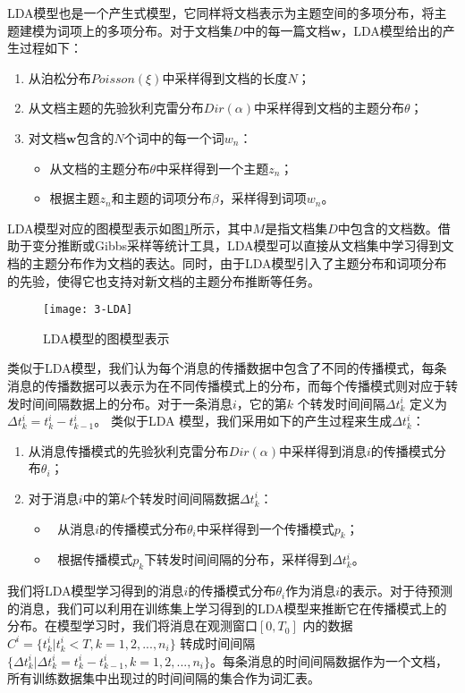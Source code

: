 LDA模型也是一个产生式模型，它同样将文档表示为主题空间的多项分布，将主题建模为词项上的多项分布。对于文档集$D$中的每一篇文档$\pmb{w}$，LDA模型给出的产生过程如下：
\begin{enumerate}
\item 从泊松分布$Poisson(\xi)$中采样得到文档的长度$N$；
\item 从文档主题的先验狄利克雷分布$Dir(\alpha)$中采样得到文档的主题分布$\theta$；
\item 对文档$\pmb{w}$包含的$N$个词中的每一个词$w_n$：
\begin{itemize}
\item 从文档的主题分布$\theta$中采样得到一个主题$z_n$；
\item 根据主题$z_n$和主题的词项分布$\beta$，采样得到词项$w_n$。
\end{itemize}
\end{enumerate}
LDA模型对应的图模型表示如图\ref{fig:LDA}所示，其中$M$是指文档集$D$中包含的文档数。借助于变分推断或Gibbs采样等统计工具，LDA模型可以直接从文档集中学习得到文档的主题分布作为文档的表达。同时，由于LDA模型引入了主题分布和词项分布的先验，使得它也支持对新文档的主题分布推断等任务。
\begin{figure}[!htbp]
  \centering
  \texttt{[image: 3-LDA]}
  \caption{LDA模型的图模型表示\citep{blei2003latent}}
  \label{fig:LDA}
\end{figure}

类似于LDA模型，我们认为每个消息的传播数据中包含了不同的传播模式，每条消息的传播数据可以表示为在不同传播模式上的分布，而每个传播模式则对应于转发时间间隔数据上的分布。对于一条消息$i$，它的第$k$ 个转发时间间隔$\Delta t_k^i$ 定义为$\Delta t_k^i=t_k^i-t_{k-1}^i$。 类似于LDA 模型，我们采用如下的产生过程来生成$\Delta t_k^i$：
\begin{enumerate}
\item 从消息传播模式的先验狄利克雷分布$Dir(\alpha)$中采样得到消息$i$的传播模式分布$\theta_i$；
\item 对于消息$i$中的第$k$个转发时间间隔数据$\Delta t_k^i$：
\begin{itemize}
\item	从消息$i$的传播模式分布$\theta_i$中采样得到一个传播模式$p_k$；
\item	根据传播模式$p_k$下转发时间间隔的分布，采样得到$\Delta t_k^i$。
\end{itemize}
\end{enumerate}

我们将LDA模型学习得到的消息$i$的传播模式分布$\theta_i$作为消息$i$的表示。对于待预测的消息，我们可以利用在训练集上学习得到的LDA模型来推断它在传播模式上的分布。在模型学习时，我们将消息在观测窗口$[0,T_0]$ 内的数据$C^i=\{t_k^i|t_k^i<T,k=1,2,...,n_i\}$ 转成时间间隔 $\{\Delta t_k^i|\Delta t_k^i=t_k^i-t_{k-1}^i,k=1,2,...,n_i\}$。每条消息的时间间隔数据作为一个文档，所有训练数据集中出现过的时间间隔的集合作为词汇表。

